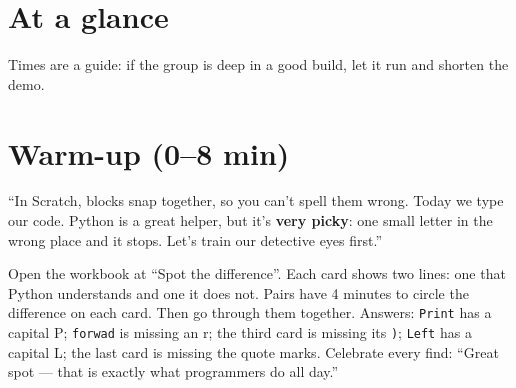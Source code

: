 \section{At a glance}
Times are a guide: if the group is deep in a good build, let it run and shorten the demo.
\begin{timeplan}
\end{timeplan}

\section{Warm-up (0--8 min)}
\begin{teacherscript}
\enquote{In Scratch, blocks snap together, so you can't spell them wrong. Today we type our code. Python is a great helper, but it's \textbf{very picky}: one small letter in the wrong place and it stops. Let's train our detective eyes first.}
\end{teacherscript}
\begin{unplugged}
Open the workbook at \enquote{Spot the difference}. Each card shows two lines: one that Python understands and one it does not. Pairs have 4 minutes to circle the difference on each card. Then go through them together.
Answers: \texttt{Print} has a capital P; \texttt{forwad} is missing an r; the third card is missing its \texttt{)}; \texttt{Left} has a capital L; the last card is missing the quote marks. Celebrate every find: \enquote{Great spot --- that is exactly what programmers do all day.}
\end{unplugged}


